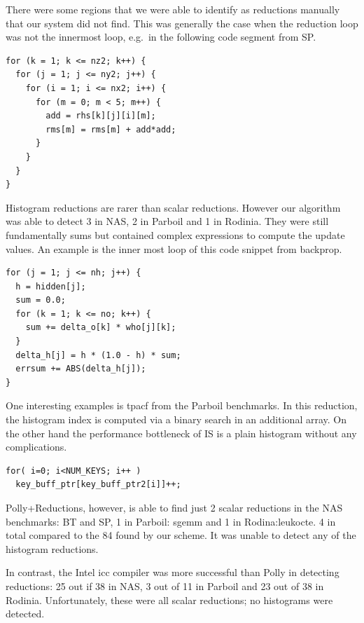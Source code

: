 There were some regions that we were able to identify as reductions manually that our system did not find.
This was generally the case when the reduction loop was not the innermost loop, e.g.\ in the following code segment from SP.
\begin{lstlisting}[language=MyCpp]
for (k = 1; k <= nz2; k++) {
  for (j = 1; j <= ny2; j++) {
    for (i = 1; i <= nx2; i++) {
      for (m = 0; m < 5; m++) {
        add = rhs[k][j][i][m];
        rms[m] = rms[m] + add*add;
      } 
    } 
  } 
}
\end{lstlisting}


Histogram reductions are rarer than scalar reductions.  However
our algorithm was able to detect 3 in NAS, 2 in Parboil and 1 in
Rodinia.   They were still fundamentally sums but contained
complex expressions to compute the update values.  An  example is the
inner most loop of this code snippet from backprop.
\begin{lstlisting}[language=MyCpp]
for (j = 1; j <= nh; j++) {
  h = hidden[j];
  sum = 0.0;
  for (k = 1; k <= no; k++) {
    sum += delta_o[k] * who[j][k];
  }
  delta_h[j] = h * (1.0 - h) * sum;
  errsum += ABS(delta_h[j]);
}
\end{lstlisting}

One interesting examples is tpacf from the Parboil benchmarks.
In this reduction, the histogram index is computed via a binary search in an additional array.
On the other hand the performance bottleneck of IS is a plain histogram without any complications.
\begin{lstlisting}[language=MyCpp]
for( i=0; i<NUM_KEYS; i++ )
  key_buff_ptr[key_buff_ptr2[i]]++;
\end{lstlisting}

Polly+Reductions, however, is able to find just 2 scalar reductions in
the NAS benchmarks: BT and SP, 1 in Parboil: sgemm and 1 in
Rodina:leukocte. 4 in total compared to the 84 found by our scheme. It
was unable to detect any of the histogram reductions.

In contrast, the Intel icc compiler was more successful than Polly in detecting 
reductions: 25  out if 38 in NAS, 3 out of 11 in Parboil and 23 out of 38 in Rodinia.
Unfortunately, these were all scalar reductions; no histograms were detected.

